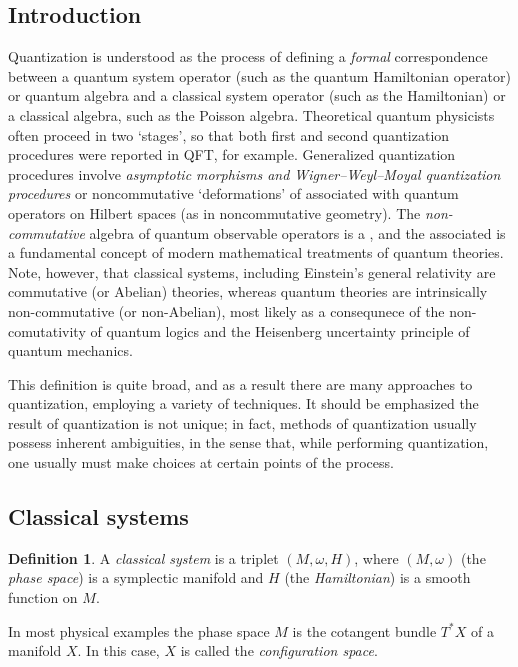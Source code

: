 \documentclass[12pt]{article}
\theoremstyle{definition}
\newtheorem{dfn}[thm]{Definition}
\theoremstyle{remark}
\begin{document}
\subsection{Introduction}
Quantization is understood as the process of defining a \emph{formal} correspondence between a quantum system operator (such as the quantum Hamiltonian operator) or quantum algebra and a classical system operator (such as the Hamiltonian) or a classical algebra, such as the Poisson algebra.  Theoretical quantum physicists often proceed in two `stages', so that both first and second quantization procedures were reported in QFT, for example. Generalized quantization procedures involve \emph{asymptotic morphisms and Wigner--Weyl--Moyal quantization procedures} or noncommutative `deformations' of  associated with quantum operators on Hilbert spaces (as in noncommutative geometry). The \emph{non-commutative} algebra of quantum observable operators is a 
, and the associated 
 is a fundamental concept of modern mathematical treatments of quantum theories. Note, however, that classical systems, including Einstein's general relativity are commutative (or Abelian) theories, whereas quantum theories are intrinsically non-commutative (or non-Abelian), most likely as a consequnece of the non-comutativity of quantum logics and the Heisenberg uncertainty principle of quantum mechanics. 

This definition is quite broad, and as a result there are many approaches to quantization, employing a variety of techniques.  It should be emphasized the result of quantization is not unique; in fact, methods of quantization usually possess inherent ambiguities, in the sense that, while performing quantization, one usually must make choices at certain points of the process.

\subsection*{Classical systems}

\begin{dfn}A \emph{classical system} is a triplet $(M, \omega, H)$, where $(M, \omega)$ (the \emph{phase space}) is a symplectic manifold and $H$ (the \emph{Hamiltonian}) is a smooth function on $M$.
\end{dfn}

In most physical examples the phase space $M$ is the cotangent bundle $T^*X$ of a manifold $X$.  In this case, $X$ is called the \emph{configuration space}.  
\end{document}
